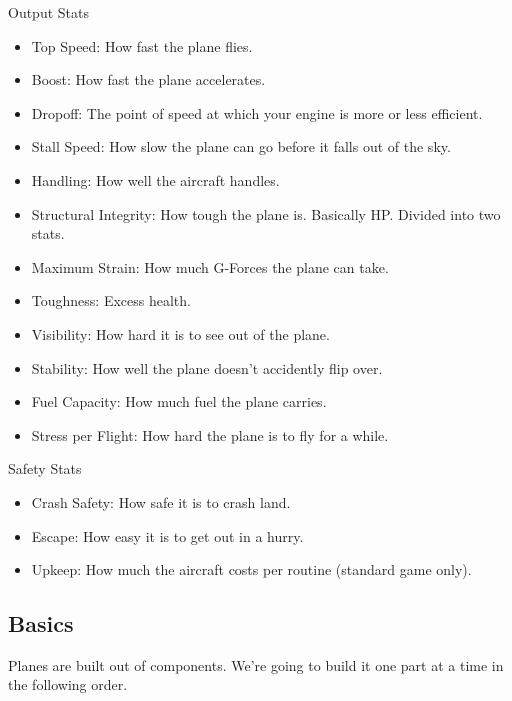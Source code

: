 \documentclass{article}
\begin{document}
Output Stats

\begin{itemize}
    \item          Top Speed: How fast the plane flies.
    \item          Boost: How fast the plane accelerates.
    \item          Dropoff: The point of speed at which your engine is more or
          less efficient.
    \item          Stall Speed: How slow the plane can go before it falls out of
          the sky.
    \item          Handling: How well the aircraft handles.
    \item          Structural Integrity: How tough the plane is. Basically HP.
          Divided into two stats.
    \item          Maximum Strain: How much G-Forces the plane can take.
    \item          Toughness: Excess health.
    \item          Visibility: How hard it is to see out of the plane.
    \item          Stability: How well the plane doesn't accidently flip over.
    \item          Fuel Capacity: How much fuel the plane carries.
    \item          Stress per Flight: How hard the plane is to fly for a while.
\end{itemize}

Safety Stats

\begin{itemize}
    \item          Crash Safety: How safe it is to crash land.
    \item          Escape: How easy it is to get out in a hurry.
    \item          Upkeep: How much the aircraft costs per routine (standard game
          only).
\end{itemize}

\subsection{Basics}
\label{_Basics}

Planes are built out of components. We're going to build it one part at
a time in the following order.
\end{document}
